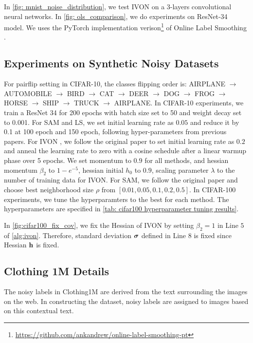 In \cref{fig: mnist_noise_distribution}, we test IVON on a 3-layers convolutional neural networks. In \cref{fig: ols_comparison}, we do experiments on ResNet-34 model. We uses the PyTorch implementation verison\footnote{\href{https://github.com/ankandrew/online-label-smoothing-pt}{https://github.com/ankandrew/online-label-smoothing-pt}} of Online Label Smoothing \citep{zhang2021delving}. 

\subsection{Experiments on Synthetic Noisy Datasets} \label{sec: cifar_exp_details}
For pairflip setting in CIFAR-10, the classes flipping order is: AIRPLANE $\rightarrow$ AUTOMOBILE $\rightarrow$ BIRD $\rightarrow$ CAT $\rightarrow$ DEER $\rightarrow$ DOG $\rightarrow$ FROG $\rightarrow$ HORSE $\rightarrow$ SHIP $\rightarrow$ TRUCK $\rightarrow$ AIRPLANE.
In CIFAR-10 experiments, we train a ResNet 34 for 200 epochs with batch size set to 50 and weight decay set to 0.001. For SAM and LS, we set initial learning rate as $0.05$ and reduce it by 0.1 at 100 epoch and 150 epoch, following hyper-parameters from previous papers. For IVON \citep{IVON}, we follow the original paper to set initial learning rate as $0.2$ and anneal the learning rate to zero with a cosine schedule after a linear warmup phase over 5 epochs. We set momentum to $0.9$ for all methods, and hessian momentum $\beta_2$ to $1 - e^{-5}$, hessian initial $h_0$ to $0.9$, scaling parameter $\lambda$ to the number of training data for IVON. For SAM, we follow the original paper \citep{SAM_org} and choose best neighborhood size $\rho$ from $[0.01, 0.05, 0.1, 0.2, 0.5]$. In CIFAR-100 experiments, we tune the hyperparamters to the best for each method. The hyperparameters are specified in \cref{tab: cifar100 hyperparameter tuning results}. 

In \cref{fig:cifar100_fix_cov}, we fix the Hessian of IVON by setting $\beta_2=1$ in Line $5$ of \cref{alg:ivon}. Therefore, standard deviation $\mbox{$\mbox{$\boldsymbol{\sigma}$}$}$ defined in Line $8$ is fixed since Hessian $\mbox{$\mbox{$\mathbf{h}$}$}$ is fixed.


\subsection{Clothing 1M Details}
The noisy labels in Clothing1M \citep{xiao2015learning} are derived from the text surrounding the images on the web. In constructing the dataset, noisy labels are assigned to images based on this contextual text. 
